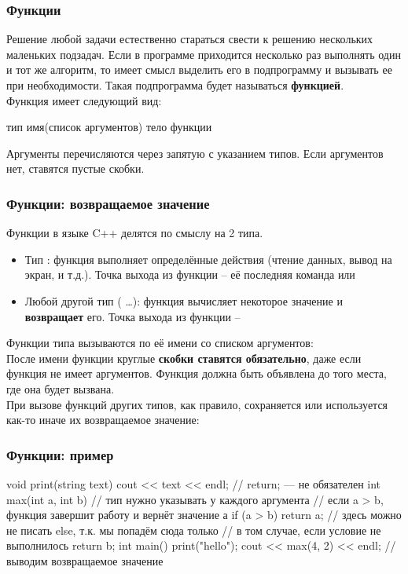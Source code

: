 

\begin{frame}[fragile]
	\frametitle{Функции}
	Решение любой задачи естественно стараться свести к решению нескольких
	маленьких подзадач. Если в программе приходится несколько раз выполнять один и
	тот же алгоритм, то имеет смысл выделить его в подпрограмму и вызывать ее при
	необходимости. Такая подпрограмма будет называться {\bf функцией}. \\
	
	Функция имеет следующий вид:
	\begin{code}
тип имя(список аргументов)
{
	тело функции
}
	\end{code}

	Аргументы перечисляются через запятую с указанием типов. Если аргументов нет,
	ставятся пустые скобки.
\end{frame}

\begin{frame}
	\frametitle{Функции: возвращаемое значение}
	Функции в языке C++ делятся по смыслу на 2 типа.
	\begin{itemize}
		\item Тип : функция выполняет определённые действия (чтение
			данных, вывод на экран, и т.д.). Точка выхода из функции -- её последняя
			команда или 
		\item Любой другой тип ( \dots): функция вычисляет
			некоторое значение и {\bf возвращает} его. Точка выхода из функции --
	\end{itemize}
	Функции типа  вызываются по её имени со списком аргументов:
	\\
	После имени функции круглые {\bf скобки ставятся обязательно}, даже если
	функция не имеет аргументов. Функция должна быть объявлена до того места, где
	она будет вызвана. \\

	При вызове функций других типов, как правило, сохраняется или используется
	как-то иначе их возвращаемое значение: \\
\end{frame}

\begin{frame}[fragile]
	\frametitle{Функции: пример}
	\begin{code}
void print(string text)
{
	cout << text << endl;
	// return; — не обязателен
}
int max(int a, int b) // тип нужно указывать у каждого аргумента
{
	// если a > b, функция завершит работу и вернёт значение а
	if (a > b) return a;
	// здесь можно не писать else, т.к. мы попадём сюда только
	// в том случае, если условие не выполнилось
	return b;
}
int main()
{
	print("hello");
	cout << max(4, 2) << endl; // выводим возвращаемое значение
}
	\end{code}
\end{frame}

